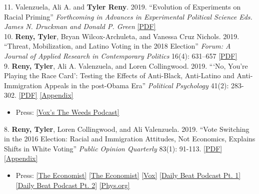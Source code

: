 \documentclass[11pt, a4paper]{article}
\newcommand{\years}[1]{\marginnote{\scriptsize #1}}
\begin{document}
\years{2019} 11. Valenzuela, Ali A. and \textbf{Tyler Reny}. 2019. ``Evolution of Experiments on Racial Priming''  \textit{Forthcoming in Advances in Experimental Political Science Eds. James N. Druckman and Donald P. Green} \href{http://tylerreny.github.io/pdf/pubs/ValenzuelaReny_racial_priming_cambridge_handbook.pdf}{[PDF]}\\

\years{} 10. \textbf{Reny, Tyler}, Bryan Wilcox-Archuleta, and Vanessa Cruz Nichols. 2019. ``Threat, Mobilization, and Latino Voting in the 2018 Election''  \textit{Forum: A Journal of Applied Research in Contemporary Politics} 16(4): 631–657 \href{http://tylerreny.github.io/pdf/pubs/reny_wilcox_cruz_nichols2019.pdf}{[PDF]} \\

\years{} 9. \textbf{Reny, Tyler}, Ali A. Valenzuela, and Loren Collingwood. 2019. ```No, You’re Playing the Race Card': Testing the Effects of Anti-Black, Anti-Latino and Anti-Immigration Appeals in the post-Obama Era''  \textit{Political Psychology} 41(2): 283-302. \href{http://tylerreny.github.io/pdf/pubs/reny_etal_2019_polpsych.pdf}{[PDF]} \href{http://tylerreny.github.io/pdf/pubs/reny_etal_2019_polpsych_appendix.pdf}{[Appendix]} 
\begin{itemize}
  \item Press: \href{https://megaphone.link/VMP5167113125}{[Vox's The Weeds Podcast]} 
\end{itemize}

\years{} 8. \textbf{Reny, Tyler}, Loren Collingwood, and Ali Valenzuela. 2019. ``Vote Switching in the 2016 Election: Racial and Immigration Attitudes, Not Economics, Explains Shifts in White Voting''  \textit{Public Opinion Quarterly} 83(1): 91-113. \href{http://tylerreny.github.io/pdf/pubs/final_submission_reny_etal_poq_public.pdf}{[PDF]} \href{http://tylerreny.github.io/pdf/pubs/final_submission_reny_etal_poq_2018_appendix.pdf}{[Appendix]}

\begin{itemize}
  \item Press: \href{https://www.economist.com/united-states/2020/02/01/who-will-be-donald-trumps-most-forceful-foe}{[The Economist]} \href{https://www.economist.com/united-states/2019/07/04/the-best-line-in-the-first-televised-debate-may-hurt-the-democrats}{[The Economist]} \href{https://www.vox.com/policy-and-politics/2018/10/16/17980820/trump-obama-2016-race-racism-class-economy-2018-midterm}{[Vox]} \href{http://www.btrtoday.com/listen/thedailybeat/vote-switching-in-the-2016-election-with-tyler-reny-part-1/}{[Daily Beat Podcast Pt. 1]} \href{http://www.btrtoday.com/listen/thedailybeat/vote-switching-white-economic-anxiety-more-with-tyler-reny-part2/}{[Daily Beat Podcast Pt. 2]} \href{https://phys.org/news/2019-07-attitudes-immigration-underscored-vote-election.html}{[Phys.org]}
\end{itemize}
\end{document}
